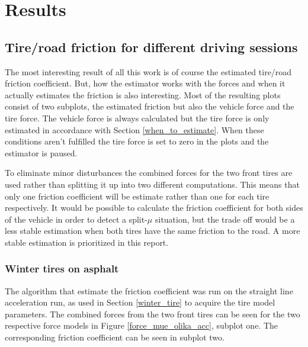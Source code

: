 \chapter{Results}
\label{chapter_five}

\section{Tire/road friction for different driving sessions}
The most interesting result of all this work is of course the estimated tire/road friction coefficient. But, how the estimator works with the forces and when it actually estimates the friction is also interesting. Most of the resulting plots consist of two subplots, the estimated friction but also the vehicle force and the tire force. The vehicle force is always calculated but the tire force is only estimated in accordance with Section \ref{when_to_estimate}. When these conditions aren't fulfilled the tire force is set to zero in the plots and the estimator is paused.

To eliminate minor disturbances the combined forces for the two front tires are used rather than splitting it up into two different computations. This means that only one friction coefficient will be estimate rather than one for each tire respectively. It would be possible to calculate the friction coefficient for both sides of the vehicle in order to detect a split-$ \mu $ situation, but the trade off would be a less stable estimation when both tires have the same friction to the road. A more stable estimation is prioritized in this report.

\subsection{Winter tires on asphalt}
The algorithm that estimate the friction coefficient was run on the straight line acceleration run, as used in Section \ref{winter_tire} to acquire the tire model parameters. The combined forces from the two front tires can be seen for the two respective force models in Figure \ref{force_mue_olika_acc}, subplot one. The corresponding friction coefficient can be seen in subplot two. 

